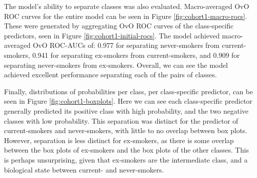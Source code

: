 \documentclass[draft]{article} %
\begin{document}
The model's ability to separate classes was also evaluated. Macro-averaged OvO ROC curves for the entire model can be seen in Figure \ref{fig:cohort1-macro-rocs}. These were generated by aggregating OvO ROC curves of the class-specific predictors, seen in Figure \ref{fig:cohort1-initial-rocs}. The model achieved macro-averaged OvO ROC-AUCs of: 0.977 for separating never-smokers from current-smokers, 0.941 for separating ex-smokers from current-smokers, and 0.909 for separating never-smokers from ex-smokers. Overall, we can see the model achieved excellent performance separating each of the pairs of classes.

Finally, distributions of probabilities per class, per class-specific predictor, can be seen in Figure \ref{fig:cohort1-boxplots}. Here we can see each class-specific predictor generally predicted its positive class with high probability, and the two negative classes with low probability. This separation was distinct for the predictor of current-smokers and never-smokers, with little to no overlap between box plots. However, separation is less distinct for ex-smokers, as there is some overlap between the box plots of ex-smokers and the box plots of the other classes. This is perhaps unsurprising, given that ex-smokers are the intermediate class, and a biological state between current- and never-smokers.
\end{document}
